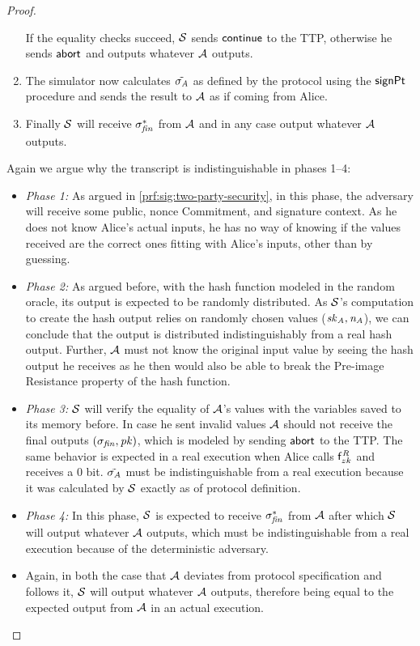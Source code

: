 \begin{proof}
\begin{enumerate}
        If the equality checks succeed, $\mathcal{S}$ sends $\mathsf{continue}$ to the TTP, otherwise he sends $\mathsf{abort}$ and outputs whatever $\mathcal{A}$ outputs.
        \item The simulator now calculates $\tilde{\sigma_{\mathit{A}}}$ as defined by the protocol using the $\mathsf{signPt}$ procedure and sends the result to $\mathcal{A}$ as if coming from Alice.
        \item Finally $\mathcal{S}$ will receive $\sigma_{\mathit{fin}}^*$ from $\mathcal{A}$ and in any case output whatever $\mathcal{A}$ outputs.
    \end{enumerate}
    
    Again we argue why the transcript is indistinguishable in phases 1--4:
    \begin{itemize}
        \item \textit{Phase 1:} As argued in \cref{prf:sig:two-party-security}, in this phase, the adversary will receive some public, nonce Commitment, and signature context.
        As he does not know Alice's actual inputs, he has no way of knowing if the values received are the correct ones fitting with Alice's inputs, other than by guessing.
        \item \textit{Phase 2:} As argued before, with the hash function modeled in the random oracle, its output is expected to be randomly distributed.
        As $\mathcal{S}$'s computation to create the hash output relies on randomly chosen values ($\mathit{sk}_{\mathit{A}}, \mathit{\mathit{n}_{\mathit{A}}}$), we can conclude that the output is distributed indistinguishably from a real hash output.
        Further, $\mathcal{A}$ must not know the original input value by seeing the hash output he receives as he then would also be able to break the Pre-image Resistance property of the hash function.
        \item \textit{Phase 3:} $\mathcal{S}$ will verify the equality of $\mathcal{A}$'s values with the variables saved to its memory before.
        In case he sent invalid values $\mathcal{A}$ should not receive the final outputs $(\sigma_{\mathit{fin}}, \mathit{pk})$, which is modeled by sending $\mathsf{abort}$ to the TTP.
        The same behavior is expected in a real execution when Alice calls $\mathsf{f}^{\mathit{R}}_{zk}$ and receives a 0 bit.
        $\tilde{\sigma_{\mathit{A}}}$ must be indistinguishable from a real execution because it was calculated by $\mathcal{S}$ exactly as of protocol definition.
        \item \textit{Phase 4:} In this phase, $\mathcal{S}$ is expected to receive $\sigma_{\mathit{fin}}^*$ from $\mathcal{A}$ after which $\mathcal{S}$ will output whatever $\mathcal{A}$ outputs, which must be indistinguishable from a real execution because of the deterministic adversary.
        \item Again, in both the case that $\mathcal{A}$ deviates from protocol specification and follows it, $\mathcal{S}$ will output whatever $\mathcal{A}$ outputs, therefore being equal to the expected output from $\mathcal{A}$ in an actual execution.
    \end{itemize}


\end{proof}
